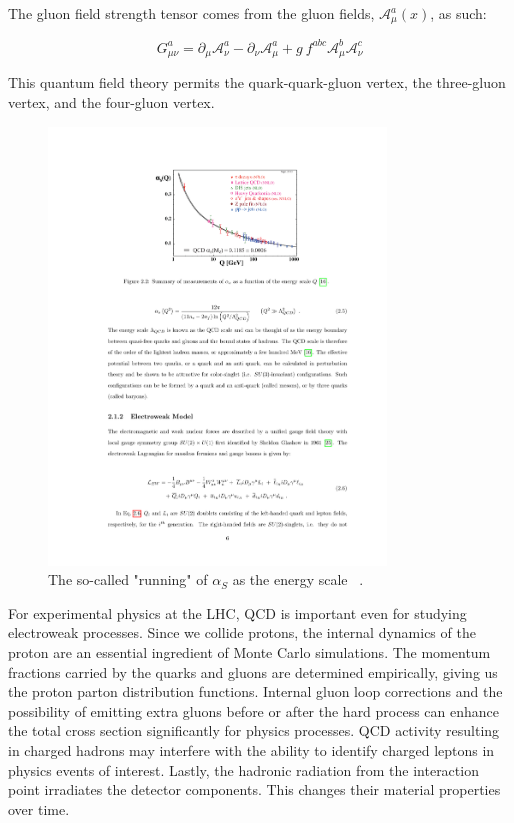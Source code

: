 The gluon field strength tensor comes from the gluon fields, $\mathcal{A}^a_\mu(x)$, as such:

\begin{equation}
G^a_{\mu\nu} = \partial_\mu \mathcal{A}^a_\nu - \partial_\nu \mathcal{A}^a_\mu + g\:f^{abc} \mathcal{A}^b_\mu \mathcal{A}^c_\nu
\end{equation}

This quantum field theory permits the quark-quark-gluon vertex, the three-gluon vertex, and the four-gluon vertex.

\begin{figure}[!hbtp]
  \centering
    \includegraphics[width=0.80\textwidth]{figures/alphaS_running.pdf}
  \caption{The so-called "running" of $\alpha_S$ as the energy scale ~\cite{PhysRevD.98.030001}.} 
  \label{fig:alphaS}
\end{figure}


For experimental physics at the LHC, QCD is important even for studying electroweak processes.
Since we collide protons, the internal dynamics of the proton are an essential ingredient of Monte Carlo simulations.
The momentum fractions carried by the quarks and gluons are determined empirically, giving us the proton parton distribution functions.
Internal gluon loop corrections and the possibility of emitting extra gluons before or after the hard process can enhance the total cross section significantly for physics processes.
QCD activity resulting in charged hadrons may interfere with the ability to identify charged leptons in physics events of interest.
Lastly, the hadronic radiation from the interaction point irradiates the detector components. This changes their material properties over time.

